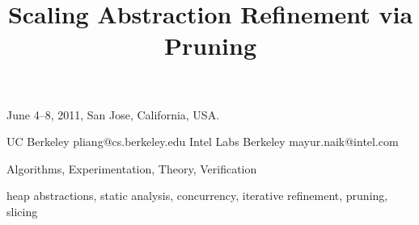 \documentclass[nocopyrightspace,9pt]{sigplanconf}
\begin{document}
 {June 4--8, 2011, San Jose, California, USA.}


\title{Scaling Abstraction Refinement via Pruning}

           {UC  Berkeley}
           {pliang@cs.berkeley.edu}
           {Intel Labs Berkeley}
           {mayur.naik@intel.com}




\maketitle


\terms
Algorithms, Experimentation, Theory, Verification

\keywords
heap abstractions, static analysis, concurrency, iterative refinement, pruning, slicing















\end{document}

